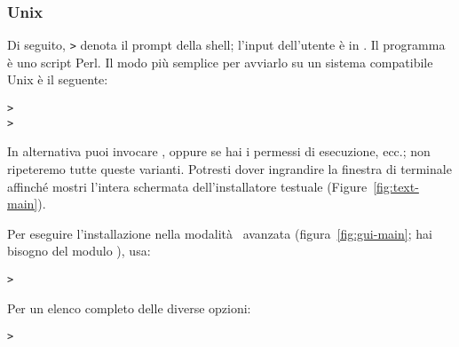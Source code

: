 \documentclass{article}
\begin{document}
\subsubsection{Unix}

\noindent
Di seguito, \texttt{>} denota il prompt della shell; l'input dell'utente è
in .
Il programma  è uno script Perl. Il modo più semplice
per avviarlo su un sistema compatibile Unix è il seguente:
\begin{alltt}
> 
> 
\end{alltt}
In alternativa puoi invocare
, oppure
 se hai i permessi di esecuzione, ecc.; non ripeteremo
tutte queste varianti. Potresti dover ingrandire la finestra di terminale
affinché mostri l'intera schermata dell'installatore testuale
(Figure~\ref{fig:text-main}).

Per eseguire l'installazione nella modalità \GUI\ avanzata
(figura~\ref{fig:gui-main}; hai bisogno del modulo ),
usa:
\begin{alltt}
> 
\end{alltt}

Per un elenco completo delle diverse opzioni:
\begin{alltt}
> 
\end{alltt}
\end{document}
